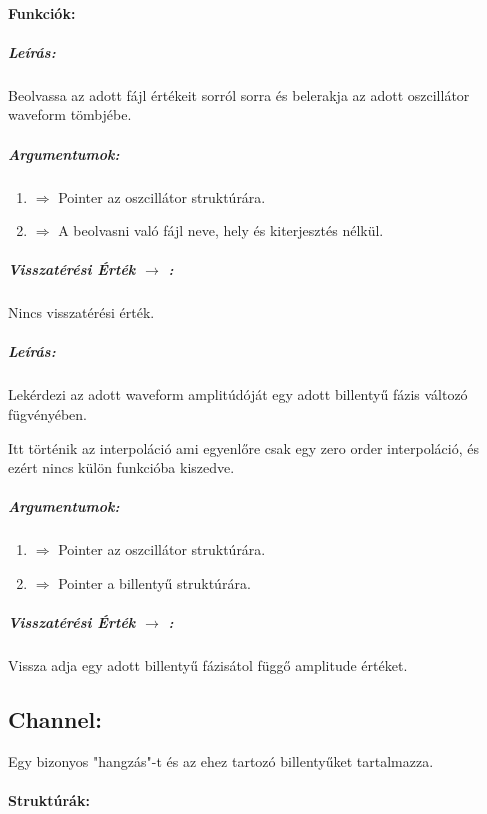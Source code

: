 \documentclass{article}
\begin{document}
\paragraph{Funkciók:}


\subparagraph{Leírás:}
Beolvassa az adott fájl értékeit sorról sorra és belerakja
az adott oszcillátor waveform tömbjébe.

\subparagraph{Argumentumok:}
\begin{enumerate}
    \item {} \(\Rightarrow\) Pointer az 
        oszcillátor struktúrára.
    \item {} \(\Rightarrow\) A beolvasni való fájl neve,
        hely és kiterjesztés nélkül.
\end{enumerate}

\subparagraph{Visszatérési Érték \(\rightarrow\) :}
Nincs visszatérési érték.
\chline


\subparagraph{Leírás:}
Lekérdezi az adott waveform amplitúdóját egy adott billentyű
fázis változó fügvényében.

Itt történik az interpoláció ami egyenlőre csak egy zero order 
interpoláció, és ezért nincs külön funkcióba kiszedve.

\subparagraph{Argumentumok:}
\begin{enumerate}
    \item {} \(\Rightarrow\) Pointer az 
        oszcillátor struktúrára.
    \item {} \(\Rightarrow\) Pointer a billentyű struktúrára.
\end{enumerate}

\subparagraph{Visszatérési Érték \(\rightarrow\) :}
Vissza adja egy adott billentyű fázisátol függő amplitude értéket.
\chline

\subsection{Channel:}
Egy bizonyos "hangzás"-t és az ehez tartozó billentyűket tartalmazza.

\paragraph{Struktúrák:}
\end{document}
